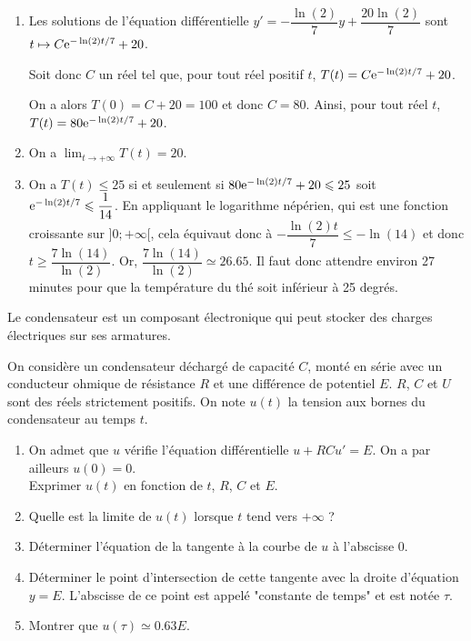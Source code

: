 \documentclass[11pt,fleqn, openany]{book} %
\begin{document}
\begin{solution} \hspace{0pt}
\begin{enumerate}\item Les solutions de l'équation différentielle \(y'=-\dfrac{\ln(2)}{7}y+\dfrac{20\ln(2)}{7}\) sont \(t\mapsto C\mathrm{e}^{-\ln(2)t/7}+20\). 

Soit donc \(C\) un réel tel que, pour tout réel positif \(t\), \(T(t)=C\mathrm{e}^{-\ln(2)t/7}+20\). 

On a alors \(T(0)=C+20=100\) et donc \(C=80\). Ainsi, pour tout réel \(t\), \(T(t)=80\mathrm{e}^{-\ln(2)t/7}+20\).
	\item On a \(\displaystyle\lim_{t\to +\infty}T(t)=20\).
	\item  On a \(T(t) \leqslant 25\) si et seulement si \(80\mathrm{e}^{-\ln(2)t/7}+20 \leqslant 25\) soit \(\mathrm{e}^{-\ln(2)t/7} \leqslant \dfrac{1}{14}\). En appliquant le logarithme népérien, qui est une fonction croissante sur \(]0;+\infty[\), cela équivaut donc à \(-\dfrac{\ln(2)t}{7} \leqslant - \ln(14)\) et donc \(t \geqslant \dfrac{7\ln(14)}{\ln(2)}\). Or, \(\dfrac{7\ln(14)}{\ln(2)} \simeq 26.65\). Il faut donc attendre environ 27 minutes pour que la température du thé soit inférieur à 25 degrés.\end{enumerate}

 \end{solution}
 
 


\begin{exercise}[topic=diff03, subtitle={(Circuit RC)}]Le condensateur est un composant électronique qui peut stocker des charges électriques sur ses armatures.

On considère un condensateur déchargé de capacité $C$, monté en série avec un conducteur ohmique de résistance $R$ et une différence de potentiel $E$. $R$, $C$ et $U$ sont des réels strictement positifs. On note $u(t)$ la tension aux bornes du condensateur au temps $t$.
\begin{enumerate}
\item On admet que $u$ vérifie l'équation différentielle $u+RCu'=E$. On a par ailleurs $u(0)=0$. \\ Exprimer $u(t)$ en fonction de $t$, $R$, $C$ et $E$.
\item Quelle est la limite de $u(t)$ lorsque $t$ tend vers $+\infty$ ?
\item Déterminer l'équation de la tangente à la courbe de $u$ à l'abscisse 0.
\item Déterminer le point d'intersection de cette tangente avec la droite d'équation $y=E$. L'abscisse de ce point est appelé "constante de temps" et est notée $\tau$.
\item Montrer que $u(\tau)\simeq 0.63 E$.
\end{enumerate}\newpage \end{exercise}
\end{document}
